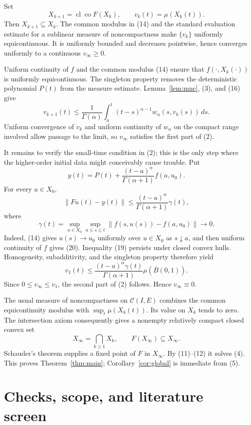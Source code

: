 \documentclass[11pt]{article}
\newcommand{\C}{\mathcal C}
\newcommand{\co}{\operatorname{co}}
\newcommand{\cl}{\operatorname{cl}}
\newcommand{\B}{\overline B}
\newcommand{\Ga}{\Gamma}
\begin{document}
Set
\[
 X_{k+1}=\cl\co F(X_k),\qquad v_k(t)=\mu(X_k(t)).             \tag{16}
\]
Then $X_{k+1}\subseteq X_k$.  The common modulus in (14) and the standard
evaluation estimate for a sublinear measure of noncompactness make
$\{v_k\}$ uniformly equicontinuous.  It is uniformly bounded and decreases
pointwise, hence converges uniformly to a continuous $v_\infty\geq0$.

Uniform continuity of $f$ and the common modulus (14) ensure that
$f(\cdot,X_k(\cdot))$ is uniformly equicontinuous.  The singleton property
removes the deterministic polynomial $P(t)$ from the measure estimate.
Lemma~\ref{lem:mnc}, (3), and (16) give
\[
 v_{k+1}(t)\leq\frac1{\Ga(\alpha)}\int_a^t(t-s)^{\alpha-1}
 w_\alpha(s,v_k(s))\,ds.                                    \tag{17}
\]
Uniform convergence of $v_k$ and uniform continuity of $w_\alpha$ on the
compact range involved allow passage to the limit, so $v_\infty$ satisfies
the first part of (2).

It remains to verify the small-time condition in (2); this is the only step
where the higher-order initial data might conceivably cause trouble.  Put
\[
 y(t)=P(t)+\frac{(t-a)^\alpha}{\Ga(\alpha+1)}f(a,u_0).        \tag{18}
\]
For every $u\in X_0$,
\[
 \|Fu(t)-y(t)\|
 \leq\frac{(t-a)^\alpha}{\Ga(\alpha+1)}\gamma(t),            \tag{19}
\]
where
\[
 \gamma(t)=\sup_{u\in X_0}\sup_{a\leq s\leq t}
 \|f(s,u(s))-f(a,u_0)\|\longrightarrow0.                    \tag{20}
\]
Indeed, (14) gives $u(s)\to u_0$ uniformly over $u\in X_0$ as $s\downarrow
a$, and then uniform continuity of $f$ gives (20).  Inequality (19) persists
under closed convex hulls.  Homogeneity, subadditivity, and the singleton
property therefore yield
\[
 v_1(t)\leq\frac{(t-a)^\alpha\gamma(t)}{\Ga(\alpha+1)}
 \mu(\B(0,1)).                                                \tag{21}
\]
Since $0\leq v_\infty\leq v_1$, the second part of (2) follows.  Hence
$v_\infty\equiv0$.

The usual measure of noncompactness on $\C(I,E)$ combines the common
equicontinuity modulus with $\sup_t\mu(X_k(t))$.  Its value on $X_k$ tends to
zero.  The intersection axiom consequently gives a nonempty relatively
compact closed convex set
\[
 X_\infty=\bigcap_{k\geq1}X_k,\qquad F(X_\infty)\subseteq X_\infty. \tag{22}
\]
Schauder's theorem supplies a fixed point of $F$ in $X_\infty$.  By (11)--(12)
it solves (4).  This proves Theorem~\ref{thm:main}; Corollary~\ref{cor:global}
is immediate from (5).

\section{Checks, scope, and literature screen}
\end{document}
